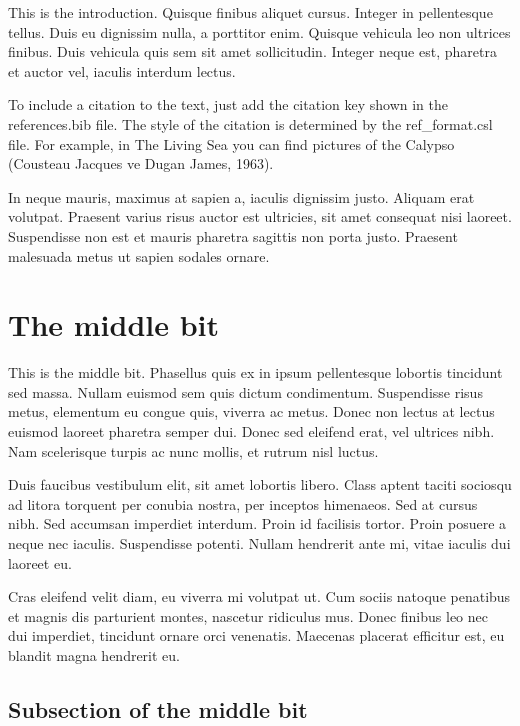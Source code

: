 \documentclass[12pt,turkish,a4paperpaper,]{report}
\begin{document}
This is the introduction. Quisque finibus aliquet cursus. Integer in
pellentesque tellus. Duis eu dignissim nulla, a porttitor enim. Quisque
vehicula leo non ultrices finibus. Duis vehicula quis sem sit amet
sollicitudin. Integer neque est, pharetra et auctor vel, iaculis
interdum lectus.

To include a citation to the text, just add the citation key shown in
the references.bib file. The style of the citation is determined by the
ref\_format.csl file. For example, in The Living Sea you can find
pictures of the Calypso (Cousteau Jacques ve Dugan James, 1963).

In neque mauris, maximus at sapien a, iaculis dignissim justo. Aliquam
erat volutpat. Praesent varius risus auctor est ultricies, sit amet
consequat nisi laoreet. Suspendisse non est et mauris pharetra sagittis
non porta justo. Praesent malesuada metus ut sapien sodales ornare.

\hypertarget{the-middle-bit}{%
\section{The middle bit}\label{the-middle-bit}}

This is the middle bit. Phasellus quis ex in ipsum pellentesque lobortis
tincidunt sed massa. Nullam euismod sem quis dictum condimentum.
Suspendisse risus metus, elementum eu congue quis, viverra ac metus.
Donec non lectus at lectus euismod laoreet pharetra semper dui. Donec
sed eleifend erat, vel ultrices nibh. Nam scelerisque turpis ac nunc
mollis, et rutrum nisl luctus.

Duis faucibus vestibulum elit, sit amet lobortis libero. Class aptent
taciti sociosqu ad litora torquent per conubia nostra, per inceptos
himenaeos. Sed at cursus nibh. Sed accumsan imperdiet interdum. Proin id
facilisis tortor. Proin posuere a neque nec iaculis. Suspendisse
potenti. Nullam hendrerit ante mi, vitae iaculis dui laoreet eu.

Cras eleifend velit diam, eu viverra mi volutpat ut. Cum sociis natoque
penatibus et magnis dis parturient montes, nascetur ridiculus mus. Donec
finibus leo nec dui imperdiet, tincidunt ornare orci venenatis. Maecenas
placerat efficitur est, eu blandit magna hendrerit eu.

\hypertarget{subsection-of-the-middle-bit}{%
\subsection{Subsection of the middle
bit}\label{subsection-of-the-middle-bit}}
\end{document}
